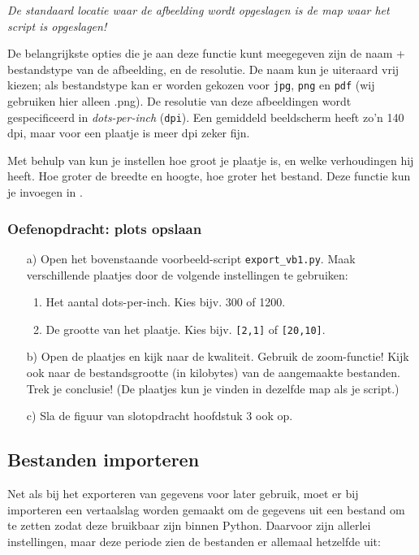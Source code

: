 \documentclass[a4paper,11pt, fleqn]{article}
\begin{document}
{\it De standaard locatie waar de afbeelding wordt opgeslagen is de map waar het script is opgeslagen!}

De belangrijkste opties die je aan deze functie kunt meegegeven zijn de naam + bestandstype van de afbeelding, en de resolutie. De naam kun je uiteraard vrij kiezen; als bestandstype kan er worden gekozen voor \verb.jpg., \verb.png. en  \verb.pdf. (wij gebruiken hier alleen .png). 
De resolutie van deze afbeeldingen wordt gespecificeerd in \textit{dots-per-inch}  (\verb,dpi,). Een gemiddeld beeldscherm heeft zo'n 140 dpi, maar voor een plaatje is meer dpi zeker fijn.

Met behulp van  kun je instellen hoe groot je plaatje is, en welke verhoudingen hij heeft. Hoe groter de breedte en hoogte, hoe groter het bestand. Deze functie kun je invoegen in .


\subsubsection*{Oefenopdracht: plots opslaan} 
\begin{itemize}
	\setlength\itemsep{0em}
	\item[a)] Open het bovenstaande voorbeeld-script \verb,export_vb1.py,. Maak verschillende plaatjes door de volgende instellingen te gebruiken:

	\begin{enumerate}
		\item Het aantal dots-per-inch. Kies bijv. 300 of 1200.
		\item De grootte van het plaatje. Kies bijv. \verb=[2,1]= of \verb=[20,10]=.
	\end{enumerate}

	\item[b)] Open de plaatjes en kijk naar de kwaliteit. Gebruik de zoom-functie! Kijk ook naar de bestandsgrootte (in kilobytes) van de aangemaakte bestanden. Trek je conclusie! (De plaatjes kun je vinden in dezelfde map als je script.)
	
	\item[c)] Sla de figuur van slotopdracht hoofdstuk 3 ook op.
\end{itemize}

\subsection{Bestanden importeren}
Net als bij het exporteren van gegevens voor later gebruik, moet er bij importeren een vertaalslag worden gemaakt om de gegevens uit een bestand om te zetten zodat deze bruikbaar zijn binnen Python. Daarvoor zijn allerlei instellingen, maar deze periode zien de bestanden er allemaal hetzelfde uit:
\end{document}

